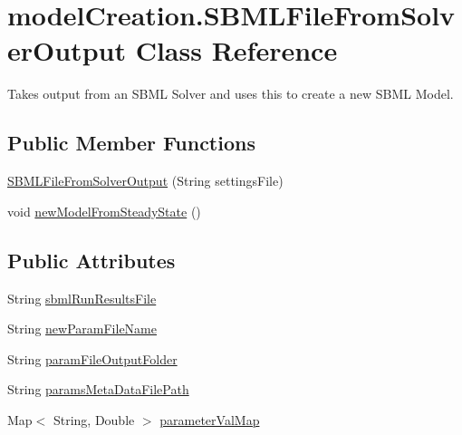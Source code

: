 \hypertarget{classmodelCreation_1_1SBMLFileFromSolverOutput}{}\section{model\+Creation.\+S\+B\+M\+L\+File\+From\+Solver\+Output Class Reference}
\label{classmodelCreation_1_1SBMLFileFromSolverOutput}


Takes output from an S\+B\+M\+L Solver and uses this to create a new S\+B\+M\+L Model.  


\subsection*{Public Member Functions}
\begin{DoxyCompactItemize}
\item 
\hyperlink{classmodelCreation_1_1SBMLFileFromSolverOutput_a026908a2d786f5afd28af3ec10a2ba59}{S\+B\+M\+L\+File\+From\+Solver\+Output} (String settings\+File)
\item 
void \hyperlink{classmodelCreation_1_1SBMLFileFromSolverOutput_a8937f216d84ada211edd91fa3eced031}{new\+Model\+From\+Steady\+State} ()
\end{DoxyCompactItemize}
\subsection*{Public Attributes}
\begin{DoxyCompactItemize}
\item 
String \hyperlink{classmodelCreation_1_1SBMLFileFromSolverOutput_a576ec90f937bd27a6eeb5412cf703982}{sbml\+Run\+Results\+File}
\item 
String \hyperlink{classmodelCreation_1_1SBMLFileFromSolverOutput_a3dabc1e12b88d40c848522587c5bf030}{new\+Param\+File\+Name}
\item 
String \hyperlink{classmodelCreation_1_1SBMLFileFromSolverOutput_af591398c2cb29728868573ddf6792f69}{param\+File\+Output\+Folder}
\item 
String \hyperlink{classmodelCreation_1_1SBMLFileFromSolverOutput_aefcb646a15d0e3309795a5161f64d6a4}{params\+Meta\+Data\+File\+Path}
\item 
Map$<$ String, Double $>$ \hyperlink{classmodelCreation_1_1SBMLFileFromSolverOutput_a18afa2219461eb36592c13828a8a8e3d}{parameter\+Val\+Map}
\end{DoxyCompactItemize}


